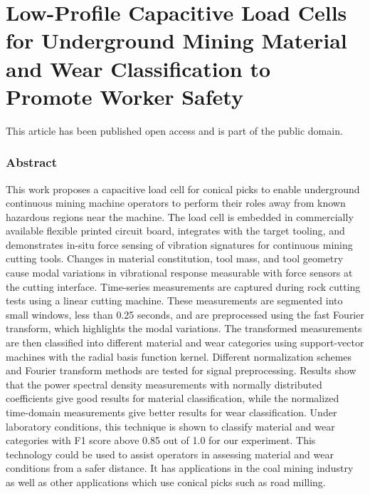 \chapter[
Capacitive Load Cells to 
 Promote Worker Safety
]{
Low-Profile Capacitive Load Cells for 
 Underground Mining Material and Wear Classification
 to Promote Worker Safety
\label{chap:P1}
}

\newcommand{\ora}{\overrightarrow}

\begin{center}
This article has been published open access and is part of the public domain.
\end{center}

\subsection{Abstract}

This work proposes a capacitive load cell for conical picks to enable 
 underground continuous mining machine operators to 
 perform their roles away from known hazardous regions near the machine.
The load cell is embedded in commercially available flexible printed circuit board,
 integrates with the target tooling, and demonstrates in-situ force sensing 
 of vibration signatures for continuous mining cutting tools.
Changes in material constitution, tool mass, and tool geometry cause modal variations
 in vibrational response measurable with force sensors at the cutting interface.
Time-series measurements are captured during rock cutting tests using a linear cutting machine.
These measurements are segmented into small windows, less than 0.25 seconds, and are preprocessed 
 using the fast Fourier transform, which highlights the modal variations.
The transformed measurements are then classified into different material and wear categories
 using support-vector machines with the radial basis function kernel.
Different normalization schemes and Fourier transform methods are tested for signal preprocessing.
Results show that the power spectral density measurements with normally distributed coefficients 
 give good results for material classification, while the normalized time-domain measurements
 give better results for wear classification.
Under laboratory conditions, this technique is shown to 
 classify material and wear categories with F1 score above 0.85 out of 1.0 for our experiment.
This technology could be used to assist operators in assessing material and wear conditions from
 a safer distance. 
It has applications in the coal mining industry as well as other applications
which use conical picks such as road milling.

